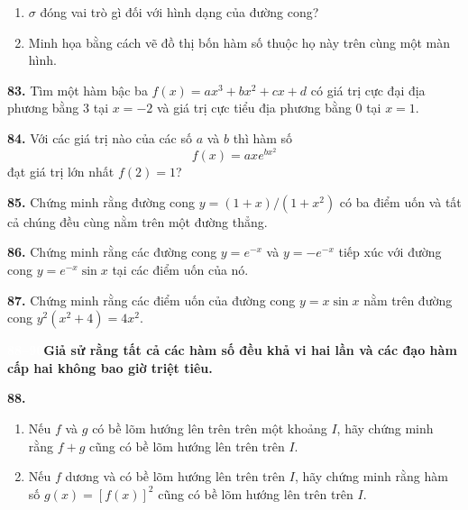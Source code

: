 \begin{minipage}[t]{0.485\textwidth}
\begin{enumerate}[label=(\alph*), itemsep=0.5pt, topsep=0pt, parsep=0pt, leftmargin=1.5em, start=2]
    \item \makebox[0pt][r]{\casicon\hspace{4pt}}$\sigma$ đóng vai trò gì đối với hình dạng của đường cong?
    \item Minh họa bằng cách vẽ đồ thị bốn hàm số thuộc họ này trên cùng một màn hình.
\end{enumerate}

\vspace{2mm}
\textbf{83.} Tìm một hàm bậc ba $f(x) = ax^3 + bx^2 + cx + d$ có giá trị cực đại địa phương bằng $3$ tại $x = -2$ và giá trị cực tiểu địa phương bằng $0$ tại $x = 1$.

\vspace{2mm}
\textbf{84.} Với các giá trị nào của các số $a$ và $b$ thì hàm số
\[
f(x) = axe^{bx^2}
\]
đạt giá trị lớn nhất $f(2) = 1$?

\vspace{2mm}
\textbf{85.} Chứng minh rằng đường cong $y = (1 + x)/(1 + x^2)$ có ba điểm uốn và tất cả chúng đều cùng nằm trên một đường thẳng.

\vspace{2mm}
\textbf{86.} Chứng minh rằng các đường cong $y = e^{-x}$ và $y = -e^{-x}$ tiếp xúc với đường cong $y = e^{-x} \sin x$ tại các điểm uốn của nó.

\vspace{2mm}
\textbf{87.} Chứng minh rằng các điểm uốn của đường cong $y = x \sin x$ nằm trên đường cong $y^2(x^2 + 4) = 4x^2$.

\vspace{2.2mm}
\noindent\colorbox{stewartcyan}{\textcolor{white}{\textbf{88--90}}}\quad \textbf{Giả sử rằng tất cả các hàm số đều khả vi hai lần và các đạo hàm cấp hai không bao giờ triệt tiêu.}

\vspace{1.8mm}
\textbf{88.}
\begin{enumerate}[label=(\alph*), itemsep=0.5pt, topsep=1.5pt, parsep=0pt, leftmargin=1.5em]
    \item Nếu $f$ và $g$ có bề lõm hướng lên trên trên một khoảng $I$, hãy chứng minh rằng $f + g$ cũng có bề lõm hướng lên trên trên $I$.
    \item Nếu $f$ dương và có bề lõm hướng lên trên trên $I$, hãy chứng minh rằng hàm số $g(x) = [f(x)]^2$ cũng có bề lõm hướng lên trên trên $I$.
\end{enumerate}


\end{minipage}

